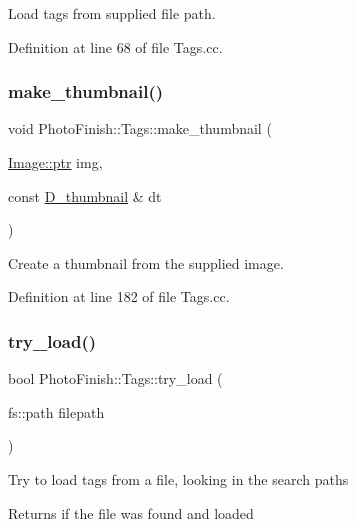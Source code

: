 Load tags from supplied file path. 



Definition at line 68 of file Tags.\+cc.

\mbox{\label{class_photo_finish_1_1_tags_ad13fda695ce72a1059f2797ef2968a9e}} 
\subsubsection{\texorpdfstring{make\+\_\+thumbnail()}{make\_thumbnail()}}
{\footnotesize\ttfamily void Photo\+Finish\+::\+Tags\+::make\+\_\+thumbnail (\begin{DoxyParamCaption}\item[{\hyperlink{class_photo_finish_1_1_image_ab336203305ed3a1397d7245063353b5a}{Image\+::ptr}}]{img,  }\item[{const \hyperlink{class_photo_finish_1_1_d__thumbnail}{D\+\_\+thumbnail} \&}]{dt }\end{DoxyParamCaption})}



Create a thumbnail from the supplied image. 



Definition at line 182 of file Tags.\+cc.

\mbox{\label{class_photo_finish_1_1_tags_ab798e399cc1588fa010c6e64c060c9f1}} 
\subsubsection{\texorpdfstring{try\+\_\+load()}{try\_load()}}
{\footnotesize\ttfamily bool Photo\+Finish\+::\+Tags\+::try\+\_\+load (\begin{DoxyParamCaption}\item[{fs\+::path}]{filepath }\end{DoxyParamCaption})}

Try to load tags from a file, looking in the search paths \begin{DoxyReturn}{Returns}
if the file was found and loaded 
\end{DoxyReturn}


